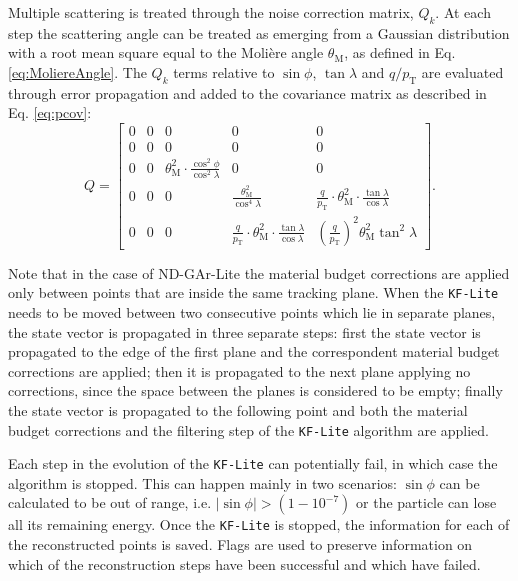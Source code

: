Multiple scattering is treated through the noise correction matrix, $Q_k$. At each step the scattering angle can be treated as emerging from a Gaussian distribution with a root mean square equal to the Molière angle $\theta_{\textrm{M}}$, as defined in Eq. \ref{eq:MoliereAngle}. The $Q_k$ terms relative to $\sin \phi$, $\tan \lambda$ and $q/p_{\text{T}}$ are evaluated through error propagation and added to the covariance matrix as described in Eq. \ref{eq:pcov}:
\begin{equation}\label{eq:Q}
    Q =\begin{bmatrix}
    0 & 0 & 0 & 0& 0 \\
    0 & 0 & 0 & 0& 0 \\
    0 & 0 & \theta_{\textrm{M}}^2\cdot\frac{\cos^{2}\phi}{\cos^{2}\lambda} & 0& 0 \\
    0 & 0 & 0 & \frac{\theta^2_{\textrm{M}}}{\cos^4\lambda}& \frac{q}{p_{\text{T}}}\cdot\theta^2_{\textrm{M}}\cdot\frac{\tan\lambda}{\cos\lambda} \\
    0 & 0 & 0 & \frac{q}{p_{\text{T}}}\cdot\theta^2_{\textrm{M}}\cdot\frac{\tan\lambda}{\cos\lambda}& \left(\frac{q}{p_{\textrm{T}}}\right)^2\theta^2_{\textrm{M}} \tan^2\lambda
    \end{bmatrix} .
\end{equation}

Note that in the case of ND-GAr-Lite the material budget corrections are applied only between points that are inside the same tracking plane. When the \texttt{KF-Lite} needs to be moved between two consecutive points which lie in separate planes, the state vector is propagated in three separate steps: first the state vector is propagated to the edge of the first plane and the correspondent material budget corrections are applied; then it is propagated to the next plane applying no corrections, since the space between the planes is considered to be empty; finally the state vector is propagated to the following point and both the material budget corrections and the filtering step of the \texttt{KF-Lite} algorithm are applied.

Each step in the evolution of the \texttt{KF-Lite} can potentially fail, in which case the algorithm is stopped. This can happen mainly in two scenarios: $\sin \phi$ can be calculated to be out of range, i.e. $|\sin \phi|>(1-10^{-7})$ or the particle can lose all its remaining energy. Once the \texttt{KF-Lite} is stopped, the information for each of the reconstructed points is saved. Flags are used to preserve information on which of the reconstruction steps have been successful and which have failed.


